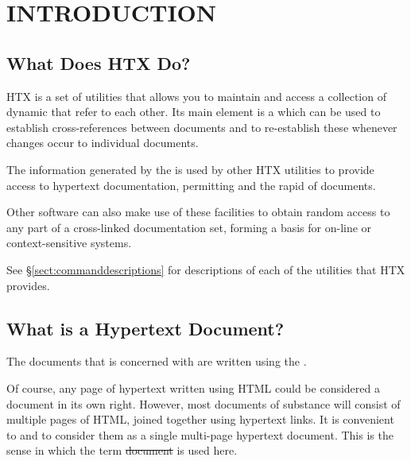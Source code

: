 \section{INTRODUCTION}

\subsection{\label{sect:HTX}What Does HTX Do?}

HTX is a set of utilities that allows you to maintain and access a
collection of dynamic  that
refer to each other. Its main element is a  which can be used to establish cross-references between
documents and to re-establish these whenever changes occur to
individual documents.

The information generated by the  is used by other HTX utilities to
provide access to hypertext documentation, permitting
 and the rapid
 of
documents.

Other software can also make use of these facilities to obtain random
access to any part of a cross-linked documentation set, forming a
basis for on-line or context-sensitive  systems.

See \S\ref{sect:commanddescriptions} for descriptions of each of the
utilities that HTX provides.

\subsection{\label{sect:hypertextdocuments}What is a Hypertext Document?}

The documents that  is concerned with are written using
the .

Of course, any page of hypertext written using HTML could be
considered a document in its own right. However, most documents of
substance will consist of multiple pages of HTML, joined together
using hypertext links. It is convenient to  and to consider them as a single multi-page
hypertext document. This is the sense in which the term \st{document}
is used here.

